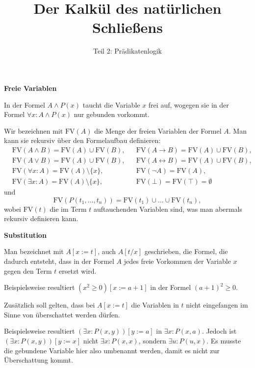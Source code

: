 \documentclass[8pt]{beamer}
\title{Der Kalkül des natürlichen Schließens}
\subtitle{Teil 2: Prädikatenlogik}
\date{}
\newcommand{\strong}[1]{\textsf{\textbf{#1}}}
\newcommand{\centerheadline}[1]{%
  \begin{center}\strong{#1}\end{center}}
\newcommand{\parspace}{\vspace{0.8em}}
\newcommand{\cond}{\rightarrow}
\newcommand{\FV}{\mathrm{FV}}
\begin{document}
\begin{frame}
\maketitle
\end{frame}

\begin{frame}
\centerheadline{Freie Variablen}
\end{frame}

\begin{frame}
In der Formel $A\land P(x)$ taucht die Variable $x$ frei auf,
wogegen sie in der Formel $\forall x\colon A\land P(x)$ nur gebunden
vorkommt.\pause

\parspace
Wir bezeichnen mit $\FV(A)$ die Menge der freien Variablen
der Formel $A$. Man kann sie rekursiv über den Formelaufbau definieren:
\begin{align*}
& \FV(A\land B) = \FV(A)\cup\FV(B), && \FV(A\cond B) = \FV(A)\cup\FV(B),\\
& \FV(A\lor B)  = \FV(A)\cup\FV(B), && \FV(A\leftrightarrow B) = \FV(A)\cup\FV(B),\\
& \FV(\forall x\colon A) = \FV(A)\setminus\{x\}, && \FV(\neg A) = \FV(A),\\
& \FV(\exists x\colon A) = \FV(A)\setminus\{x\}, && \FV(\bot) = \FV(\top) = \emptyset
\end{align*}
und
\[\FV(P(t_1,\ldots,t_n)) = \FV(t_1)\cup\ldots\cup\FV(t_n),\]
wobei $\FV(t)$ die im Term $t$ auftauchenden Variablen sind, was
man abermals rekursiv definieren kann.
\end{frame}

\begin{frame}
\centerheadline{Substitution}
\end{frame}

\begin{frame}
Man bezeichnet mit $A[x:=t]$, auch $A[t/x]$ geschrieben, die Formel,
die dadurch entsteht, dass in der Formel $A$ jedes freie Vorkommen
der Variable $x$ gegen den Term $t$ ersetzt wird.\pause

\parspace
Beispielsweise resultiert $(x^2\ge 0)[x:=a+1]$ in der Formel $(a+1)^2\ge 0$.\pause

\parspace
Zusätzlich soll gelten, dass bei $A[x:=t]$ die Variablen in $t$ nicht
eingefangen im Sinne von überschattet werden dürfen.\pause

\parspace
Beispielsweise resultiert $(\exists x\colon P(x,y))[y:=a]$ in
$\exists x\colon P(x,a)$. Jedoch ist $(\exists x\colon P(x,y))[y:=x]$
nicht $\exists x\colon P(x,x)$, sondern $\exists u\colon P(u,x)$.
Es musste die gebundene Variable hier also umbenannt werden, damit
es nicht zur Überschattung kommt.
\end{frame}
\end{document}
